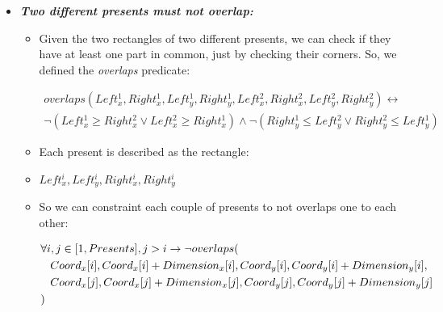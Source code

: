 \begin{itemize}
    \item \textbf{\textit{Two different presents must not overlap:}}
        \begin{itemize}
            \item[] Given the two rectangles of two different presents, we can check if they have
                at least one part in common, just by checking their corners. So, we defined the
                \textit{overlaps} predicate:
            \begin{adjustwidth}{-3cm}{}\begin{equation*}\begin{split}
                overlaps(
                    Left^1_x, Right^1_x, Left^1_y, Right^1_y,
                    Left^2_x, Right^2_x, Left^2_y, Right^2_y
                ) \leftrightarrow \\
                \neg (Left^1_x \geq Right^2_x \vee Left^2_x \geq Right^1_x) \wedge 
                \neg (Right^1_y \leq Left^2_y \vee Right^2_y \leq Left^1_y)
            \end{split}\end{equation*}\end{adjustwidth}
            \item[] Each present is described as the rectangle:
            \item[] $Left^i_x, Left^i_y, Right^i_x, Right^i_y$
            \item[] So we can constraint each couple of presents to not overlaps one to each other:
            \begin{adjustwidth}{-2.8cm}{}\begin{equation*}\begin{split}
                &\forall i, j \in [1, Presents], j > i \rightarrow \neg overlaps(\\
                &\hspace{0.3cm} Coord_x[i], Coord_x[i] + Dimension_x[i], Coord_y[i], Coord_y[i] + Dimension_y[i],\\
                &\hspace{0.3cm} Coord_x[j], Coord_x[j] + Dimension_x[j], Coord_y[j], Coord_y[j] + Dimension_y[j]\\
                &)
            \end{split}\end{equation*}\end{adjustwidth}
        \end{itemize}


\end{itemize}
